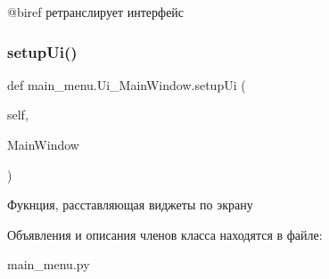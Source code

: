 @biref ретранслирует интерфейс 

\mbox{\label{classmain__menu_1_1_ui___main_window_ab775fda9b5e9b5999364c44f335bc148}} 
\subsubsection{\texorpdfstring{setupUi()}{setupUi()}}
{\footnotesize\ttfamily def main\+\_\+menu.\+Ui\+\_\+\+Main\+Window.\+setup\+Ui (\begin{DoxyParamCaption}\item[{}]{self,  }\item[{}]{Main\+Window }\end{DoxyParamCaption})}



Фукнция, расставляющая виджеты по экрану 



Объявления и описания членов класса находятся в файле\+:\begin{DoxyCompactItemize}
\item 
main\+\_\+menu.\+py\end{DoxyCompactItemize}
